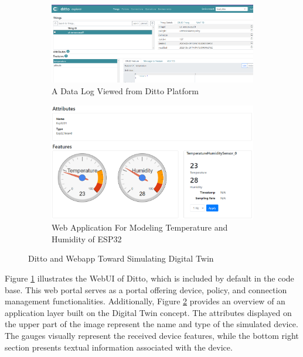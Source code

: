 \begin{figure}[H]
   
    \begin{subfigure}[c]{1\linewidth}
        
        \centering
        \includegraphics[width=\linewidth]{images/fp/ditto-log.png}
        \caption{A Data Log Viewed from Ditto Platform}
        \label{fig:ditto-log}
    \end{subfigure}
    
    \begin{subfigure}[c]{1\linewidth}
        \centering
        
        \includegraphics[width=\linewidth]{images/fp/appgauge.png}
        \caption{Web Application For Modeling Temperature and Humidity of ESP32}
        \label{fig:appdt}
     \end{subfigure} 
      \caption{Ditto and Webapp Toward Simulating Digital Twin}
    \label{fig:ditto-app}
\end{figure}

Figure \ref{fig:ditto-log} illustrates the WebUI of Ditto, which is included by default in the code base. This web portal serves as a portal offering device, policy, and connection management functionalities. Additionally, Figure \ref{fig:appdt} provides an overview of an application layer built on the Digital Twin concept. The attributes displayed on the upper part of the image represent the name and type of the simulated device. The gauges visually represent the received device features, while the bottom right section presents textual information associated with the device.

